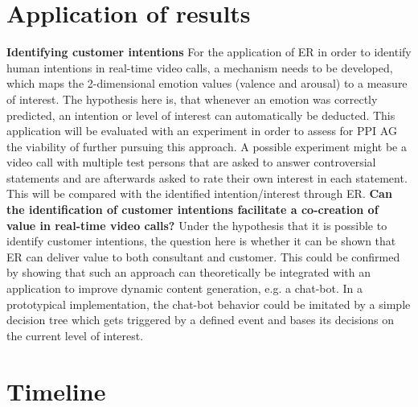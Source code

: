 \documentclass[11pt,a4paper]{scrbook}
\begin{document}
\chapter{Application of results}
\textbf{Identifying customer intentions}\newline
For the application of \gls{ER} in order to identify human intentions in real-time video calls, a mechanism needs to be developed, which maps the 2-dimensional emotion values (valence and arousal) to a measure of interest. The hypothesis here is, that whenever an emotion was correctly predicted, an intention or level of interest can automatically be deducted. This application will be evaluated with an experiment in order to assess for PPI AG the viability of further pursuing this approach. A possible experiment might be a video call with multiple test persons that are asked to answer controversial statements and are afterwards asked to rate their own interest in each statement. This will be compared with the identified intention/interest through \gls{ER}.
\newline\newline
\textbf{Can the identification of customer intentions facilitate a co-creation of value in real-time video calls?}\newline
Under the hypothesis that it is possible to identify customer intentions, the question here is whether it can be shown that \gls{ER} can deliver value to both consultant and customer. This could be confirmed by showing that such an approach can theoretically be integrated with an application to improve dynamic content generation, e.g. a chat-bot. In a prototypical implementation, the chat-bot behavior could be imitated by a simple decision tree which gets triggered by a defined event and bases its decisions on the current level of interest.


\chapter{Timeline}

\end{document}
